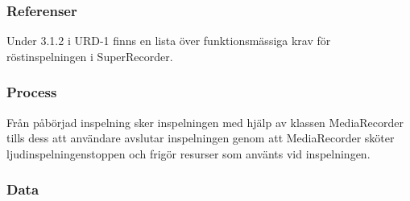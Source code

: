 \subsubsection{Referenser}
Under 3.1.2 i URD-1 finns en lista över funktionsmässiga krav för röstinspelningen i SuperRecorder.

\subsubsection{Process}
Från påbörjad inspelning sker inspelningen med hjälp av klassen MediaRecorder tills dess att användare avslutar inspelningen genom att MediaRecorder sköter ljudinspelningenstoppen och frigör resurser som använts vid inspelningen.

\subsubsection{Data}
